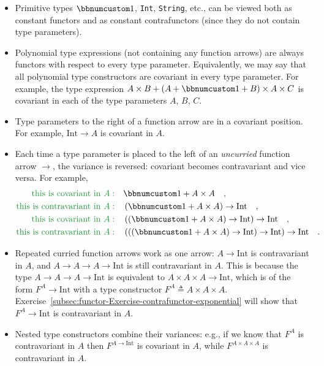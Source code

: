 \begin{itemize}
\item Primitive types $\bbnum 1$, \lstinline!Int!, \lstinline!String!,
etc., can be viewed both as constant functors and as constant contrafunctors
(since they do not contain type parameters).
\item Polynomial type expressions (not containing any function arrows) are
always functors with respect to every type
parameter. Equivalently, we may say that all polynomial type constructors
are covariant in every type parameter. For example, the type expression
$A\times B+\left(A+\bbnum 1+B\right)\times A\times C$ is covariant
in each of the type parameters $A$, $B$, $C$.
\item Type parameters to the right of a function arrow are in a covariant
position. For example, $\text{Int}\rightarrow A$ is covariant in
$A$.
\item Each time a type parameter is placed to the left of an \emph{uncurried}
function arrow $\rightarrow$, the variance is reversed: covariant
becomes contravariant and vice versa. For example,
\begin{align*}
{\color{greenunder}\text{this is covariant in }A:}\quad & \bbnum 1+A\times A\quad,\\
{\color{greenunder}\text{this is contravariant in }A:}\quad & \left(\bbnum 1+A\times A\right)\rightarrow\text{Int}\quad,\\
{\color{greenunder}\text{this is covariant in }A:}\quad & \left(\left(\bbnum 1+A\times A\right)\rightarrow\text{Int}\right)\rightarrow\text{Int}\quad,\\
{\color{greenunder}\text{this is contravariant in }A:}\quad & \left(\left(\left(\bbnum 1+A\times A\right)\rightarrow\text{Int}\right)\rightarrow\text{Int}\right)\rightarrow\text{Int}\quad.
\end{align*}
\item Repeated curried function arrows work as one arrow: $A\rightarrow\text{Int}$
is contravariant in $A$, and $A\rightarrow A\rightarrow A\rightarrow\text{Int}$
is still contravariant in $A$. This is  because the type $A\rightarrow A\rightarrow A\rightarrow\text{Int}$
is equivalent to $A\times A\times A\rightarrow\text{Int}$, which
is of the form $F^{A}\rightarrow\text{Int}$ with a type constructor
$F^{A}\triangleq A\times A\times A$. Exercise~\ref{subsec:functor-Exercise-contrafunctor-exponential}
will show that $F^{A}\rightarrow\text{Int}$ is contravariant in $A$.
\item Nested type constructors combine their variances: e.g., if we know
that $F^{A}$ is contravariant in $A$ then $F^{A\rightarrow\text{Int}}$
is covariant in $A$, while $F^{A\times A\times A}$ is contravariant
in $A$.
\end{itemize}

